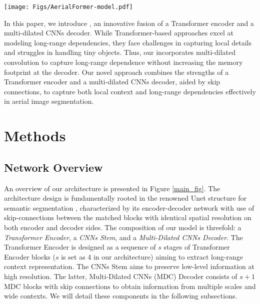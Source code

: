 \documentclass[journal]{IEEEtran}
\begin{document}
\begin{figure*}[!t]
\centering
\texttt{[image: Figs/AerialFormer-model.pdf]}
\caption{Overall network architecture of our proposed \model which consists of three components i.e., Transformer Encoder, CNNs Stem, and Multi-Dilated CNNs Decoder.}
\label{main_fig}
\end{figure*}


In this paper, we introduce \model, an innovative fusion of a Transformer encoder and a multi-dilated CNNs decoder. 
While Transformer-based approaches excel at modeling long-range dependencies, they face challenges in capturing local details and struggles in handling tiny objects. Thus, our \model incorporates multi-dilated convolution to capture long-range dependence without increasing the memory footprint at the decoder. Our novel \model approach combines the strengths of a Transformer encoder and a multi-dilated CNNs decoder, aided by skip connections, to capture both local context and long-range dependencies effectively in aerial image segmentation.
















\section{Methods}
\subsection{Network Overview}
An overview of our \model architecture is presented in Figure \ref{main_fig}. The architecture design is fundamentally rooted in the renowned Unet structure for semantic segmentation \cite{ronneberger2015u}, characterized by its encoder-decoder network with use of skip-connections between the matched blocks with identical spatial resolution on both encoder and decoder sides. The composition of our model is threefold: a\textit{ Transformer Encoder}, a \textit{CNNs Stem}, and a \textit{Multi-Dilated CNNs Decoder}. The Transformer Encoder is designed as a sequence of $s$ stages of Transformer Encoder blocks ($s$ is set as 4 in our architecture) aiming to extract long-range context representation. The CNNs Stem aims to preserve low-level information at high resolution. The latter, Multi-Dilated CNNs (MDC) Decoder consists of  $s+1$ MDC blocks with skip connections to obtain information from multiple scales and wide contexts. We will detail these components in the following subsections. 
\end{document}
